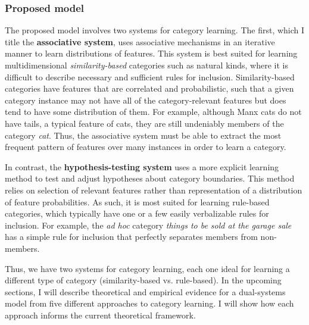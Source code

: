 \documentclass[../dissertation.tex]{subfiles}
\begin{document}
\subsubsection{Proposed model}
	The proposed model involves two systems for category learning. The first, which I title the \textbf{associative system}, uses associative mechanisms in an iterative manner to learn distributions of features. This system is best suited for learning multidimensional \textit{similarity-based} categories such as natural kinds, where it is difficult to describe necessary and sufficient rules for inclusion. Similarity-based categories have features that are correlated and probabilistic, such that a given category instance may not have all of the category-relevant features but does tend to have some distribution of them. For example, although Manx cats do not have tails, a typical feature of cats, they are still undeniably members of the category \textit{cat}. Thus, the associative system must be able to extract the most frequent pattern of features over many instances in order to learn a category. \par
	In contrast, the \textbf{hypothesis-testing system} uses a more explicit learning method to test and adjust hypotheses about category boundaries. This method relies on selection of relevant features rather than representation of a distribution of feature probabilities. As such, it is most suited for learning rule-based categories, which typically have one or a few easily verbalizable rules for inclusion. For example, the \textit{ad hoc} category \textit{things to be sold at the garage sale} has a simple rule for inclusion that perfectly separates members from non-members. \par
	Thus, we have two systems for category learning, each one ideal for learning a different type of category (similarity-based vs. rule-based). In the upcoming sections, I will describe theoretical and empirical evidence for a dual-systems model from five different approaches to category learning. I will show how each approach informs the current theoretical framework.
\end{document}
